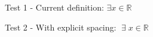\documentclass{article}
\begin{document}
Test 1 - Current definition: $\exists x \in \mathbb{R}$

Test 2 - With explicit spacing: $\;\exists\; x \in \mathbb{R}$
\end{document}
